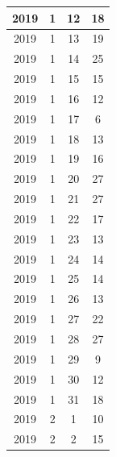 \begin{longtable} {|c|c|c|c|}
\hline
2019         & 1            & 12           & 18                        \\ 
\hline
2019         & 1            & 13           & 19                        \\ 
\hline
2019         & 1            & 14           & 25                        \\ 
\hline
2019         & 1            & 15           & 15                        \\ 
\hline
2019         & 1            & 16           & 12                        \\ 
\hline
2019         & 1            & 17           & 6                         \\ 
\hline
2019         & 1            & 18           & 13                        \\ 
\hline
2019         & 1            & 19           & 16                        \\ 
\hline
2019         & 1            & 20           & 27                        \\ 
\hline
2019         & 1            & 21           & 27                        \\ 
\hline
2019         & 1            & 22           & 17                        \\ 
\hline
2019         & 1            & 23           & 13                        \\ 
\hline
2019         & 1            & 24           & 14                        \\ 
\hline
2019         & 1            & 25           & 14                        \\ 
\hline
2019         & 1            & 26           & 13                        \\ 
\hline
2019         & 1            & 27           & 22                        \\ 
\hline
2019         & 1            & 28           & 27                        \\ 
\hline
2019         & 1            & 29           & 9                         \\ 
\hline
2019         & 1            & 30           & 12                        \\ 
\hline
2019         & 1            & 31           & 18                        \\ 
\hline
2019         & 2            & 1            & 10                        \\ 
\hline
2019         & 2            & 2            & 15                        \\ 

\end{longtable}
